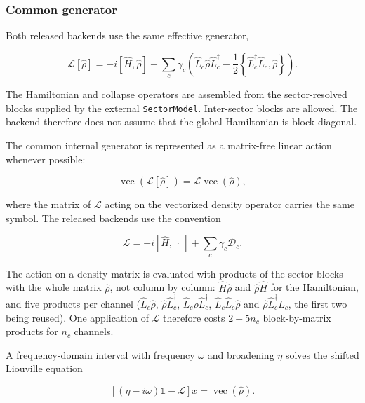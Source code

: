 \documentclass[11pt]{article}
\begin{document}
\subsubsection*{Common generator}

Both released backends use the same effective generator,

\begin{equation}
\mathcal{L}[\hat{\rho}]
=
-i[\hat{H},\hat{\rho}]
+
\sum_c
\gamma_c
\left(
\hat{L}_c\hat{\rho} \hat{L}_c^\dagger
-\frac{1}{2}
\left\{
\hat{L}_c^\dagger \hat{L}_c,\hat{\rho}
\right\}
\right).
\end{equation}

The Hamiltonian and collapse operators are assembled from the sector-resolved
blocks supplied by the external \texttt{SectorModel}. Inter-sector blocks are
allowed. The backend therefore does not assume that the global Hamiltonian is
block diagonal.

The common internal generator is represented as a matrix-free linear action
whenever possible:

\begin{equation}
\operatorname{vec}(\mathcal{L}[\hat{\rho}])
=
\mathcal{L}\operatorname{vec}(\hat{\rho}),
\end{equation}

where the matrix of \(\mathcal{L}\) acting on the vectorized density
operator carries the same symbol. The released
backends use the convention

\begin{equation}
\mathcal{L}=-i[\hat{H},\,\cdot\,]+\sum_c\gamma_c\mathcal{D}_c.
\end{equation}

The action on a density matrix is evaluated with products of the sector blocks with the whole matrix \(\hat\rho\), not column by column: \(\hat H\hat\rho\) and \(\hat\rho\hat H\) for the Hamiltonian, and five products per channel (\(\hat L_c\hat\rho\), \(\hat\rho\hat L_c^\dagger\), \(\hat L_c\hat\rho\hat L_c^\dagger\), \(\hat L_c^\dagger\hat L_c\hat\rho\) and \(\hat\rho\hat L_c^\dagger\hat L_c\), the first two being reused). One application of \(\mathcal{L}\) therefore costs \(2+5n_c\) block-by-matrix products for \(n_c\) channels.

A frequency-domain interval with frequency \(\omega\) and broadening
\(\eta\) solves the shifted Liouville equation

\begin{equation}
\left[
(\eta-i\omega)\mathbb{1}
-
\mathcal{L}
\right]x
=
\operatorname{vec}(\hat{\rho}).
\end{equation}
\end{document}
